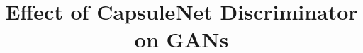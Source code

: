 \documentclass{vldb}
\begin{document}

\title{Effect of CapsuleNet Discriminator on GANs}%



%
%
%
%

\end{document}
